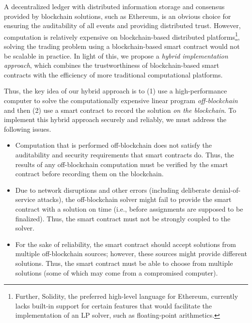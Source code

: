 
A decentralized ledger with distributed information storage and consensus provided by blockchain solutions, such as Ethereum, is an obvious choice for ensuring the auditability of all events and providing distributed trust. However, computation is relatively expensive on blockchain-based distributed platforms\footnote{Further, Solidity, the preferred high-level language for Ethereum, currently lacks built-in support for certain features that would facilitate the implementation of an LP solver, such as floating-point arithmetics.}, solving the trading problem using a block\-chain-based smart contract would not be scalable in practice.
In light of this, we propose a \emph{hybrid implementation approach}, which combines the trustworthiness of blockchain-based smart contracts with the efficiency of more traditional computational platforms.

Thus, the key idea of our hybrid approach is to (1) use a high-performance computer to solve the computationally expensive linear program \emph{off-blockchain} and then (2) use a smart contract to record the solution \emph{on the blockchain}.
To implement this hybrid approach securely and reliably, we must address the following issues.
\begin{itemize}
\item Computation that is performed off-blockchain does not satisfy the auditability and security requirements that smart contracts do. Thus, the results of any off-blockchain computation must be verified %
by the smart contract before recording them on the blockchain.
\item Due to network disruptions and other errors (including deliberate denial-of-service attacks), the off-blockchain solver might fail to provide the smart contract with a solution on time (i.e., before assignments are supposed to be finalized). Thus, the smart contract must not be strongly coupled to the solver.
\item For the sake of reliability, the smart contract should accept solutions from multiple off-blockchain sources; however, these sources might provide different solutions.
Thus, the smart contract must be able to choose from multiple solutions (some of which may come from a compromised computer).
\end{itemize}



